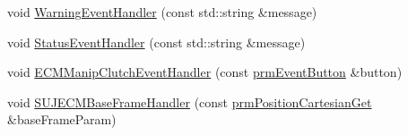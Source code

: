 \begin{DoxyCompactItemize}
void \hyperlink{classmts_intuitive_research_kit_console_a46c651ad20b031f3f2274f57c1f0e2ac}{Warning\-Event\-Handler} (const std\-::string \&message)
\item 
void \hyperlink{classmts_intuitive_research_kit_console_a391790963a1e20d898fb5924303a3c37}{Status\-Event\-Handler} (const std\-::string \&message)
\item 
void \hyperlink{classmts_intuitive_research_kit_console_a946e76b49013fc5a801d78dfb296f34b}{E\-C\-M\-Manip\-Clutch\-Event\-Handler} (const \hyperlink{classprm_event_button}{prm\-Event\-Button} \&button)
\item 
void \hyperlink{classmts_intuitive_research_kit_console_a31f4010c413ada6f43515815f4775b1b}{S\-U\-J\-E\-C\-M\-Base\-Frame\-Handler} (const \hyperlink{classprm_position_cartesian_get}{prm\-Position\-Cartesian\-Get} \&base\-Frame\-Param)
\end{DoxyCompactItemize}
